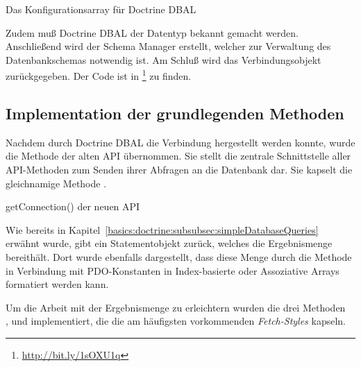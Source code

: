 \begin{listing}[H]
\caption{Das Konfigurationsarray für Doctrine DBAL}
\label{lst:DoctrineConfigArray}
\end{listing}

Zudem muß Doctrine DBAL der Datentyp  bekannt gemacht werden. Anschließend wird der Schema Manager erstellt, welcher zur Verwaltung des Datenbankschemas notwendig ist. Am Schluß wird das Verbindungsobjekt zurückgegeben. Der Code ist in \footnote{\url{http://bit.ly/1sOXU1q}} zu finden.

\subsection{Implementation der grundlegenden Methoden}
Nachdem durch Doctrine DBAL die Verbindung hergestellt werden konnte, wurde die Methode  der alten API übernommen. Sie stellt die zentrale Schnittstelle aller API-Methoden zum Senden ihrer Abfragen an die Datenbank dar. Sie kapselt die gleichnamige Methode .

\newpage

\begin{listing}
\caption{getConnection() der neuen API}
\label{lst:getConnectionNewAPI}
\end{listing}

Wie bereits in Kapitel~\ref{basics:doctrine:subsubsec:simpleDatabaseQueries} erwähnt wurde, gibt  ein Statementobjekt zurück, welches die Ergebnismenge bereithält. Dort wurde ebenfalls dargestellt, dass diese Menge durch die Methode  in Verbindung mit PDO-Konstanten in Index-basierte oder Assoziative Arrays formatiert werden kann.

Um die Arbeit mit der Ergebnismenge zu erleichtern wurden die drei Methoden\\ ,  und  implementiert, die die am häufigsten vorkommenden  \textit{Fetch-Styles} kapseln.


